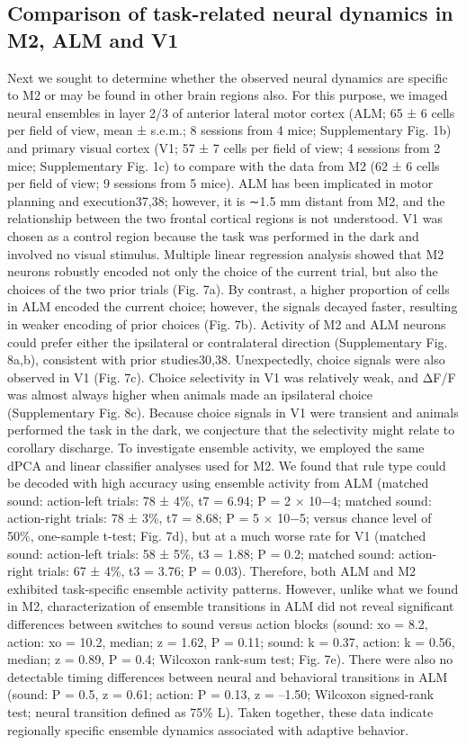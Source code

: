 \subsection{Comparison of task-related neural dynamics in M2, ALM and V1}
Next we sought to determine whether the observed neural dynamics are specific to M2 or may be found in other brain regions also. For this purpose, we imaged neural ensembles in layer 2/3 of anterior lateral motor cortex (ALM; 65 ± 6 cells per field of view, mean ± s.e.m.; 8 sessions from 4 mice; Supplementary Fig. 1b) and primary visual cortex (V1; 57 ± 7 cells per field of view; 4 sessions from 2 mice; Supplementary Fig. 1c) to compare with the data from M2 (62 ± 6 cells per field of view; 9 sessions from 5 mice). ALM has been implicated in motor planning and execution37,38; however, it is ∼1.5 mm distant from M2, and the relationship between the two frontal cortical regions is not understood. V1 was chosen as a control region because the task was performed in the dark and involved no visual stimulus. Multiple linear regression analysis showed that M2 neurons robustly encoded not only the choice of the current trial, but also the choices of the two prior trials (Fig. 7a). By contrast, a higher proportion of cells in ALM encoded the current choice; however, the signals decayed faster, resulting in weaker encoding of prior choices (Fig. 7b). Activity of M2 and ALM neurons could prefer either the ipsilateral or contralateral direction (Supplementary Fig. 8a,b), consistent with prior studies30,38. Unexpectedly, choice signals were also observed in V1 (Fig. 7c). Choice selectivity in V1 was relatively weak, and ΔF/F was almost always higher when animals made an ipsilateral choice (Supplementary Fig. 8c). Because choice signals in V1 were transient and animals performed the task in the dark, we conjecture that the selectivity might relate to corollary discharge. To investigate ensemble activity, we employed the same dPCA and linear classifier analyses used for M2. We found that rule type could be decoded with high accuracy using ensemble activity from ALM (matched sound: action-left trials: 78 ± 4\%, t7 = 6.94; P = 2 × 10−4; matched sound: action-right trials: 78 ± 3\%, t7 = 8.68; P = 5 × 10−5; versus chance level of 50\%, one-sample t-test; Fig. 7d), but at a much worse rate for V1 (matched sound: action-left trials: 58 ± 5\%, t3 = 1.88; P = 0.2; matched sound: action-right trials: 67 ± 4\%, t3 = 3.76; P = 0.03). Therefore, both ALM and M2 exhibited task-specific ensemble activity patterns. However, unlike what we found in M2, characterization of ensemble transitions in ALM did not reveal significant differences between switches to sound versus action blocks (sound: xo = 8.2, action: xo = 10.2, median; z = 1.62, P = 0.11; sound: k = 0.37, action: k = 0.56, median; z = 0.89, P = 0.4; Wilcoxon rank-sum test; Fig. 7e). There were also no detectable timing differences between neural and behavioral transitions in ALM (sound: P = 0.5, z = 0.61; action: P = 0.13, z = –1.50; Wilcoxon signed-rank test; neural transition defined as 75\% L). Taken together, these data indicate regionally specific ensemble dynamics associated with adaptive behavior.
